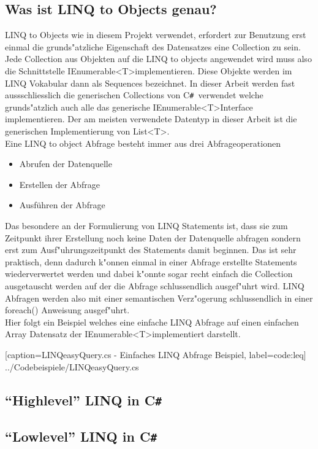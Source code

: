 \documentclass[12pt,a4paper]{scrreprt}
\newcommand{\CS}{C\texttt{\#}}
\newcommand{\CSS}{C\texttt{\# }}
\newcommand{\GT}{\textless T\textgreater}
\newcommand{\GTS}{\textless T\textgreater }
\begin{document}
		\subsection {Was ist LINQ to Objects genau? }
		LINQ to Objects wie in diesem Projekt verwendet, erfordert zur Benutzung erst einmal die grunds"atzliche Eigenschaft des Datensatzes eine Collection zu sein. Jede Collection aus Objekten auf die LINQ to objects angewendet wird muss also die Schnittstelle IEnumerable\GTS implementieren. Diese Objekte werden im LINQ Vokabular dann als Sequences bezeichnet. In dieser Arbeit werden fast aussschliesslich die generischen Collections von \CSS verwendet welche grunds"atzlich auch alle das generische IEnumerable\GTS Interface implementieren. Der am meisten verwendete Datentyp in dieser Arbeit ist die generischen Implementierung von List\GT.
\\
Eine LINQ to object Abfrage besteht immer aus drei Abfrageoperationen
\begin{itemize}
\item Abrufen der Datenquelle
\item Erstellen der Abfrage
\item Ausführen der Abfrage
\end{itemize}
Das besondere an der Formulierung von LINQ Statements ist, dass sie zum Zeitpunkt ihrer Erstellung noch keine Daten der Datenquelle abfragen sondern erst zum Ausf"uhrungszeitpunkt des Statements damit beginnen. Das ist sehr praktisch, denn dadurch k"onnen einmal in einer Abfrage erstellte Statements wiederverwertet werden und dabei k"onnte sogar recht einfach die Collection ausgetauscht werden auf der die Abfrage schlussendlich ausgef"uhrt wird. LINQ Abfragen werden also mit einer semantischen Verz"ogerung  schlussendlich in einer foreach() Anweisung ausgef"uhrt.
\\
Hier folgt ein Beispiel welches eine einfache LINQ Abfrage auf einen einfachen Array Datensatz der IEnumerable\GTS implementiert darstellt.

			[caption={LINQeasyQuery.cs - Einfaches LINQ Abfrage Beispiel}, label=code:leq]
			{../Codebeispiele/LINQeasyQuery.cs}

		\subsection {"`Highlevel"' LINQ in \CS}
		\subsection {"`Lowlevel"' LINQ in \CS}
\end{document}
